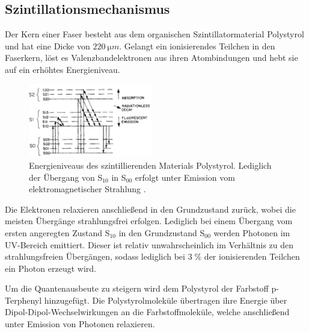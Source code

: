 \subsection{Szintillationsmechanismus}
Der Kern einer Faser besteht aus dem organischen Szintillatormaterial Polystyrol und hat eine Dicke von $\SI{220}{\micro m}$. Gelangt ein ionisierendes Teilchen in den Faserkern, löst es Valenzbandelektronen aus ihren Atombindungen und hebt sie auf ein erhöhtes Energieniveau.
\begin{figure}
  \includegraphics[width=0.48\textwidth]{plots/Energieniveaus.png}
  \caption{Energieniveaus des szintillierenden Materials Polystyrol. Lediglich der Übergang von S$_{10}$ in S$_{00}$ erfolgt unter Emission vom elektromagnetischer Strahlung \cite{anleitung}.}
  \label{fig:Niveaus}
\end{figure}
\FloatBarrier
Die Elektronen relaxieren anschließend in den Grundzustand zurück, wobei die meisten Übergänge strahlungsfrei erfolgen. Lediglich bei einem Übergang vom ersten angeregten Zustand S$_{10}$ in den Grundzustand S$_{00}$ werden Photonen im UV-Bereich emittiert. Dieser ist relativ unwahrscheinlich im Verhältnis zu den strahlungsfreien Übergängen, sodass lediglich bei 3$\;\%$ der ionisierenden Teilchen ein Photon erzeugt wird.

Um die Quantenausbeute zu steigern wird dem Polystyrol der Farbstoff p-Terphenyl hinzugefügt. Die Polystyrolmoleküle übertragen ihre Energie über Dipol-Dipol-Wechselwirkungen an die Farbstoffmoleküle, welche anschließend unter Emission von Photonen relaxieren. 

